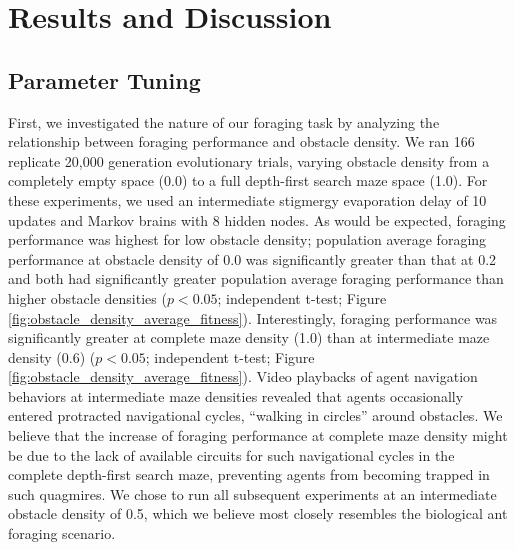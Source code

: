 \section{Results and Discussion}

\subsection{Parameter Tuning}




First, we investigated the nature of our foraging task by analyzing the relationship between foraging performance and obstacle density.
We ran 166 replicate 20,000 generation evolutionary trials, varying obstacle density from a completely empty space (0.0) to a full depth-first search maze space (1.0).
For these experiments, we used an intermediate stigmergy evaporation delay of 10 updates and Markov brains with 8 hidden nodes.
As would be expected, foraging performance was highest for low obstacle density;
population average foraging performance at obstacle density of 0.0 was significantly greater than that at 0.2 and both had significantly greater population average foraging performance than higher obstacle densities
($p < 0.05$; independent t-test; Figure \ref{fig:obstacle_density_average_fitness}).
Interestingly, foraging performance was significantly greater at complete maze density (1.0) than at intermediate maze density (0.6) ($p < 0.05$; independent t-test; Figure \ref{fig:obstacle_density_average_fitness}).
Video playbacks of agent navigation behaviors at intermediate maze densities revealed that agents occasionally entered protracted navigational cycles, ``walking in circles'' around obstacles.
We believe that the increase of foraging performance at complete maze density might be due to the lack of available circuits for such navigational cycles in the complete depth-first search maze, preventing agents from becoming trapped in such quagmires.
We chose to run all subsequent experiments at an intermediate obstacle density of 0.5, which we believe most closely resembles the biological ant foraging scenario.

